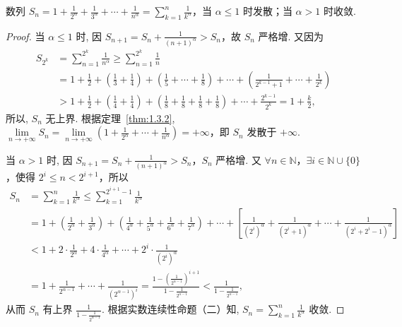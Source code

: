 \begin{example}\label{ex:1.4.2}
数列 $S_{n} = 1 + \frac{1}{2^{\alpha}} + \frac{1}{3^{\alpha}} + \cdots + \frac{1}{n^{\alpha}} = \sum\limits_{k=1}^{n}\frac{1}{k^{\alpha}}$，当 $\alpha \leqslant 1$ 时发散；当 $\alpha > 1$ 时收敛.
\end{example}

\begin{proof}
当 $\alpha \leqslant 1$ 时, 因 $S_{n+1} = S_{n} + \frac{1}{(n+1)^\alpha} > S_{n}$，故 $S_{n}$ 严格增. 又因为
\[
\begin{aligned}
S_{2^{k}} &= \sum_{n=1}^{2^{k}}\frac{1}{n^{\alpha}} \geqslant \sum_{n=1}^{2^{k}}\frac{1}{n} \\
&= 1 + \frac{1}{2} + \left(\frac{1}{3} + \frac{1}{4}\right) + \left(\frac{1}{5} + \cdots + \frac{1}{8}\right) + \cdots + \left(\frac{1}{2^{k-1}+1} + \cdots + \frac{1}{2^{k}}\right) \\
&> 1 + \frac{1}{2} + \left(\frac{1}{4} + \frac{1}{4}\right) + \left(\frac{1}{8} + \frac{1}{8} + \frac{1}{8} + \frac{1}{8}\right) + \cdots + \frac{2^{k-1}}{2^{k}} = 1 + \frac{k}{2},
\end{aligned}
\]
所以, $S_{n}$ 无上界. 根据定理~\ref{thm:1.3.2}, $\lim\limits_{n\to+\infty}S_{n} = \lim\limits_{n\to+\infty}\left(1 + \frac{1}{2^\alpha} + \cdots + \frac{1}{n^\alpha}\right) = +\infty$，即 $S_{n}$ 发散于 $+\infty$.

当 $\alpha > 1$ 时, 因 $S_{n+1} = S_n + \frac{1}{(n+1)^\alpha} > S_n$，$S_n$ 严格增. 又 $\forall n \in \mathbb{N}$，$\exists i \in \mathbb{N} \cup \{0\}$，使得 $2^i \leqslant n < 2^{i+1}$，所以
\[
\begin{aligned}
S_{n} &= \sum_{k=1}^{n}\frac{1}{k^{\alpha}} \leqslant \sum_{k=1}^{2^{i+1}-1}\frac{1}{k^{\alpha}} \\
&= 1 + \left(\frac{1}{2^{\alpha}} + \frac{1}{3^{\alpha}}\right) + \left(\frac{1}{4^{\alpha}} + \frac{1}{5^{\alpha}} + \frac{1}{6^{\alpha}} + \frac{1}{7^{\alpha}}\right) + \cdots + \left[\frac{1}{(2^{i})^{\alpha}} + \frac{1}{(2^{i}+1)^{\alpha}} + \cdots + \frac{1}{(2^{i}+2^{i}-1)^{\alpha}}\right] \\
&< 1 + 2 \cdot \frac{1}{2^{\alpha}} + 4 \cdot \frac{1}{4^{\alpha}} + \cdots + 2^{i} \cdot \frac{1}{(2^{i})^{\alpha}} \\
&= 1 + \frac{1}{2^{\alpha-1}} + \cdots + \frac{1}{(2^{\alpha-1})^i} = \frac{1 - \left(\frac{1}{2^{\alpha-1}}\right)^{i+1}}{1 - \frac{1}{2^{\alpha-1}}} < \frac{1}{1 - \frac{1}{2^{\alpha-1}}},
\end{aligned}
\]
从而 $S_{n}$ 有上界 $\frac{1}{1 - \frac{1}{2^{\alpha-1}}}$. 根据实数连续性命题（二）知, $S_{n} = \sum\limits_{k=1}^{n}\frac{1}{k^{\alpha}}$ 收敛.
\end{proof}

